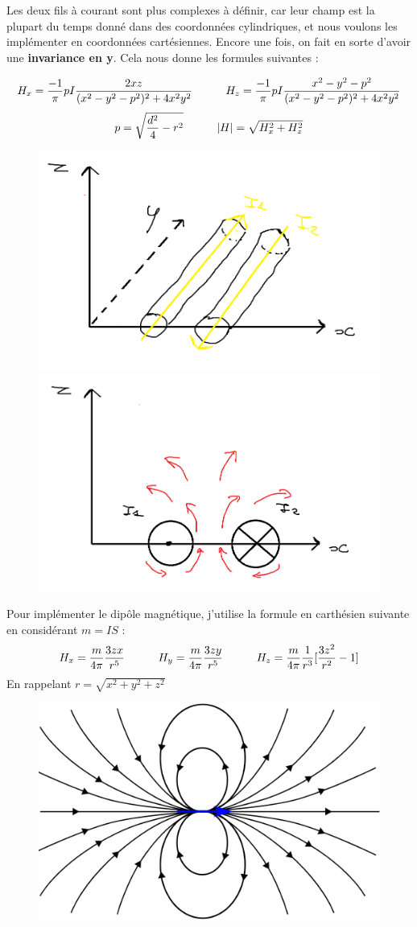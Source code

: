 \documentclass{article}
\begin{document}
Les deux fils à courant sont plus complexes à définir, car leur champ est la plupart du temps donné dans des coordonnées cylindriques, et nous voulons les implémenter en coordonnées cartésiennes. Encore une fois, on fait en sorte d'avoir une \textbf{invariance en y}. Cela nous donne les formules suivantes :

\begin{equation}
H_{x}=\frac{-1}{\pi}pI\frac{2xz}{(x^2-y^2-p^2)^2+4x^2y^2} \indent\indent  H_{z}=\frac{-1}{\pi}pI\frac{x^2-y^2-p^2}{(x^2-y^2-p^2)^2+4x^2y^2}
\label{eq09}
\end{equation}
\begin{equation}
p = \sqrt{\frac{d^2}{4} - r^2} \indent\indent |H| = \sqrt{H_{x}^2+H_{z}^2}
\label{eq10}
\end{equation}
\begin{figure}[h]
	\centering
    \includegraphics[width=.4\linewidth]{Fils.png}
    \includegraphics[width=.4\linewidth]{Fils2.png}
\end{figure}

Pour implémenter le dipôle magnétique, j'utilise la formule en carthésien suivante en considérant $m = IS$ :
\begin{equation}
H_{x} = \frac{m}{4\pi}\frac{3zx}{r^5}\indent\indent H_{y} = \frac{m}{4\pi}\frac{3zy}{r^5}\indent\indent H_{z}=\frac{m}{4\pi}\frac{1}{r^3}[\frac{3z^2}{r^2} - 1]
\end{equation}
En rappelant \textbf{$r = \sqrt{x^2 + y^2 +z^2}$}
\begin{figure}[h]
	\centering
    \includegraphics[width=.5\linewidth]{Dipole.png}
    
\end{figure}
\end{document}
